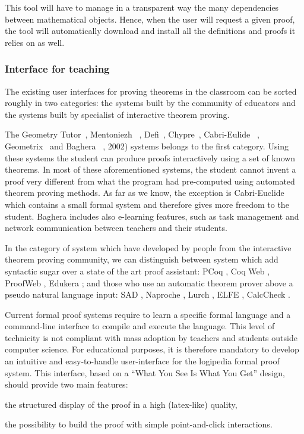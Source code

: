 This tool will have to manage in a transparent way the many
dependencies between mathematical objects. Hence, when the user will
request a given proof, the tool will automatically download and
install all the definitions and proofs it relies on as well.

\subsubsection*{Interface for teaching}

The existing user interfaces for proving theorems in the classroom can be sorted roughly in two categories: 
the systems built by the community of educators and the systems built by specialist of interactive theorem proving.

The Geometry Tutor~\cite{anderson_geometry_1985}, Mentoniezh
~\cite{py_reconnaissance_1990},
Defi~\cite{ag-almouloud_ordinateur_1992},
Chypre~\cite{bernat_chypre:_1993}, Cabri-Eulide
~\cite{luengo_cabri-euclide:_1997},
Geometrix~\cite{gressier_geometrix_1988} and Baghera
~\cite{balacheff_baghera_1999}, 2002) systems belongs to the first
category. Using these systems the student can produce proofs
interactively using a set of known theorems.  In most of these
aforementioned systems, the student cannot invent a proof very
different from what the program had pre-computed using automated
theorem proving methods. As far as we know, the exception is
Cabri-Euclide which contains a small formal system and therefore gives
more freedom to the student. Baghera includes also e-learning
features, such as task management and network communication between
teachers and their students.

In the category of system which have developed by people from the
interactive theorem proving community, we can distinguish between
system which add syntactic sugar over a state of the art proof
assistant: PCoq \cite{amerkad_mathematics_2001}, Coq Web
\cite{blanc_proofs_2007}, ProofWeb \cite{kaliszyk_deduction_2008},
Edukera \cite{rognier_presentation_2016}; and those who use an
automatic theorem prover above a pseudo natural language input: SAD
\cite{lyaletski_sad_2006}, Naproche \cite{cramer_naproche_2010}, Lurch
\cite{carter_lurch:_nodate}, ELFE \cite{dore_elfe_2018}, CalcCheck
\cite{kahl_calccheck:_2018}.

Current formal proof systems require to learn a specific formal
language and a command-line interface to compile and execute the
language. This level of technicity is not compliant with mass adoption
by teachers and students outside computer science. For educational
purposes, it is therefore mandatory to develop an intuitive and
easy-to-handle user-interface for the logipedia formal proof
system. This interface, based on a ``What You See Is What You Get''
design, should provide two main features:
\begin{compactitem}
\item the structured display of the proof in a high (latex-like) quality,
\item the possibility to build the proof with simple point-and-click
  interactions.
\end{compactitem}

